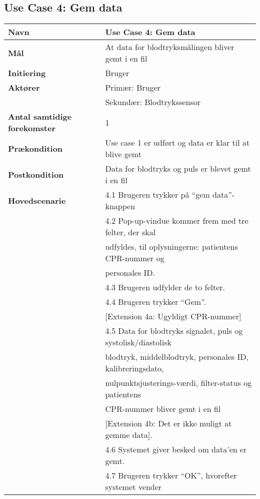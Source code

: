 \subsection{Use Case 4: Gem data}
\vspace{0.8 cm}
\begin{table}[h!]
	\begin{tabular}{l|l}
		\rowcolor[HTML]{A9D9F9} 
		\textbf{Navn} & Use Case 4: Gem data \\
		\hline
		\textbf{Mål} & At data for blodtryksmålingen bliver gemt i en fil \\
		\hline
		\rowcolor[HTML]{A9D9F9} 
		\textbf{Initiering} & Bruger \\
		\hline
		\textbf{Aktører} & Primær: Bruger \\
		\textbf{} & Sekundær: Blodtrykssensor \\
		\hline
		\rowcolor[HTML]{A9D9F9} 
		\textbf{Antal samtidige forekomster} & 1 \\
		\hline
		\textbf{Prækondition} & Use case 1 er udført og data er klar til at blive gemt \\
		\hline
		\rowcolor[HTML]{A9D9F9} 
		\textbf{Postkondition} & Data for blodtryks og puls er blevet gemt i en fil \\
		\hline
		\textbf{Hovedscenarie} & 4.1 Brugeren trykker på “gem data”-knappen \\
		& 4.2 Pop-up-vindue kommer frem med tre felter, der skal \\
		& udfyldes, til oplysningerne: patientens CPR-nummer og \\
		& personales ID. \\
		& 4.3 Brugeren udfylder de to felter. \\
		& 4.4 Brugeren trykker “Gem”. \\
		& {[}Extension 4a: Ugyldigt CPR-nummer{]} \\
		& 4.5 Data for blodtryks signalet, puls og systolisk/diastolisk \\
		& blodtryk, middelblodtryk, personales ID, kalibreringsdato, \\
		& nulpunktsjusterings-værdi, filter-status og patientens \\
		& CPR-nummer bliver gemt i en fil \\
		& {[}Extension 4b: Det er ikke muligt at gemme data{]}. \\
		& 4.6 Systemet giver besked om data’en er gemt. \\
		& 4.7 Brugeren trykker “OK”, hvorefter systemet vender \\

\end{tabular}
\end{table}
